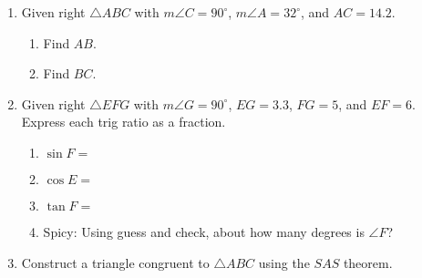 \begin{enumerate}
  \item Given right $\triangle ABC$ with $m\angle C=90^\circ$, $m\angle A = 32^\circ$, and $AC=14.2$.
    \begin{center}
    \end{center}
    \begin{enumerate}
      \item Find $AB$. \vspace{3cm}
      \item Find $BC$. \vspace{3cm}
    \end{enumerate}

\newpage
\item Given right $\triangle EFG$ with $m\angle G=90^\circ$, $EG=3.3$, $FG=5$, and $EF=6$. Express each trig ratio as a fraction.  \vspace{0.5cm}
\begin{multicols}{2}
  \begin{enumerate}
    \item $\sin F=$ \vspace{0.8cm}
    \item $\cos E=$ \vspace{0.8cm}
    \item $\tan F=$ \vspace{0.8cm}
    \item Spicy: Using guess and check, about how many degrees is $\angle F$?
  \end{enumerate}
  \begin{center}
      \vspace{2cm}
  \end{center}
  \end{multicols} \vspace{2cm}

\item Construct a triangle congruent to $\triangle ABC$ using the $SAS$ theorem.\\[2cm]


\end{enumerate}
